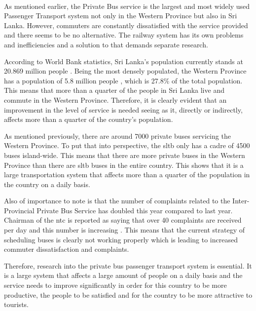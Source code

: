 \paragraph{} As mentioned earlier, the Private Bus service is the largest and most widely used Passenger Transport system not only in the Western Province but also in Sri Lanka. However, commuters are constantly dissatisfied with the service provided and there seems to be no alternative. The railway system has its own problems and inefficiencies and a solution to that demands separate research.

According to World Bank statistics, Sri Lanka's population currently stands at 20.869 million people \cite{WorldBank2013}. Being the most densely populated, the Western Province has a population of 5.8 million people \cite{DepartmentofCensusandStatistics2012}, which is 27.8\% of the total population. This means that more than a quarter of the people in Sri Lanka live and commute in the Western Province. Therefore, it is clearly evident that an improvement in the level of service is needed seeing as it, directly or indirectly, affects more than a quarter of the country's population.

As mentioned previously, there are around 7000 private buses servicing the Western Province. To put that into perspective, the \acrshort{sltb} only has a cadre of 4500 buses island-wide. This means that there are more private buses in the Western Province than there are \acrshort{sltb} buses in the entire country. This shows that it is a large transportation system that affects more than a quarter of the population in the country on a daily basis.

Also of importance to note is that the number of complaints related to the Inter-Provincial Private Bus Service has doubled this year compared to last year. Chairman of the \acrshort{ntc} is reported as saying that over 40 complaints are received per day and this number is increasing \cite{Wickremasekara2012, Range2012}. This means that the current strategy of scheduling buses is clearly not working properly which is leading to increased commuter dissatisfaction and complaints.

Therefore, research into the private bus passenger transport system is essential. It is a large system that affects a large amount of people on a daily basis and the service needs to improve significantly in order for this country to be more productive, the people to be satisfied and for the country to be more attractive to tourists.




